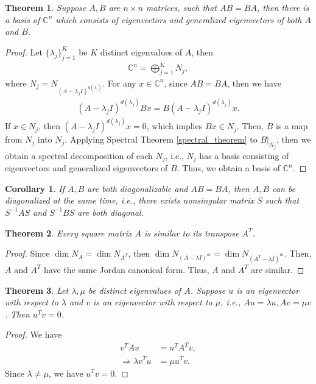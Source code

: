 \documentclass[11pt]{book}
\newtheorem{theorem}{Theorem}[chapter]
\newtheorem{corollary}{Corollary}[theorem]
\theoremstyle{definition}
\numberwithin{equation}{chapter}
\begin{document}
\medskip

\begin{theorem}{\rm \cite{18}}\label{commute_eigenspace}
Suppose $A, B$ are $n\times n$ matrices, such that $AB = BA$, then there is a basis of $\mathbb{C}^n$ which consists of eigenvectors and generalized eigenvectors of both $A$ and $B$.
\end{theorem}
\begin{proof}
Let $\{\lambda_j\}^K_{j=1}$ be $K$ distinct eigenvalues of $A$, then 
\begin{align*}
    \mathbb{C}^n = \bigoplus^K_{j=1} N_j,
\end{align*}
where $N_j = N_{(A - \lambda_j I)^{d(\lambda_j)}}$. For any $x\in\mathbb{C}^n$, since $AB = BA$, then we have
\begin{align*}
    (A - \lambda_j I)^{d(\lambda_j)} B x = B (A - \lambda_j I)^{d(\lambda_j)} x.
\end{align*}
If $x\in N_j$, then $ (A - \lambda_j I)^{d(\lambda_j)} x = 0$, which implies $Bx\in N_j$. Then, $B$ is a map from $N_j$ into $N_j$. Applying Spectral Theorem \ref{spectral_theorem} to $B|_{N_j}$, then we obtain a spectral decomposition of each $N_j$, i.e., $N_j$ has a basis consisting of eigenvectors and generalized eigenvectors of $B$. Thus, we obtain a basis of $\mathbb{C}^n$. 
\end{proof}

\begin{corollary}\label{diagonalized_same_time}{\rm \cite{43}}
If $A,B$ are both diagonalizable and $AB = BA$, then $A,B$ can be diagonalized at the same time, i.e., there exists nonsingular matrix $S$ such that $S^{-1}AS$ and $S^{-1}BS$ are both diagonal.
\end{corollary}

\medskip

\begin{theorem}
Every square matrix $A$ is similar to its transpose $A^T$.
\end{theorem}
\begin{proof}
Since $\dim  N_A = \dim  N_{A^T}$, then $\dim  N_{(A-\lambda I)^m} = \dim  N_{(A^T-\lambda I)^m}$. Then, $A$ and $A^T$ have the same Jordan canonical form. Thus, $A$ and $A^T$ are similar.
\end{proof}

\medskip

\begin{theorem}\label{eigenvector_transpose_theorem}
Let $\lambda, \mu$ be distinct eigenvalues of $A$. Suppose $u$ is an eigenvector with respect to $\lambda$ and $v$ is an eigenvector with respect to $\mu$, i.e., $Au = \lambda u, Av = \mu v$. Then $u^Tv = 0$.
\end{theorem}
\begin{proof}
We have 
\begin{align*}
    v^T A u & = u^T A^T v, \\
    \Rightarrow \lambda v^T u & = \mu u^T v.
\end{align*}
Since $\lambda \neq \mu$, we have $u^T v = 0$.
\end{proof}
\end{document}
